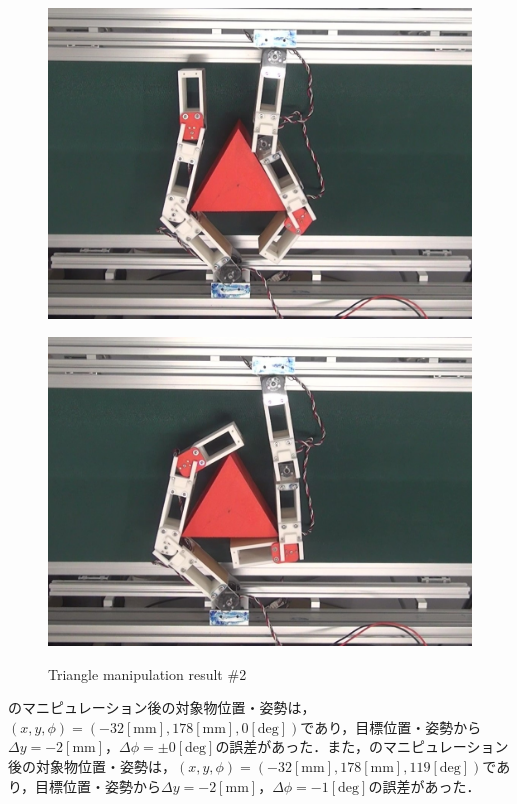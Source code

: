 \documentclass[a4paper,twoside,12pt,papersize, dvipdfmx]{iirthesis}
\begin{document}
\begin{figure}[b]
\begin{minipage}{0.249\hsize}
\includegraphics[width=0.98\hsize]{fig/4-manipulation-result/Triangle/2-3.jpg}
\subcaption{}\label{}
\end{minipage}\hfill
\begin{minipage}{0.249\hsize}
\centering
\includegraphics[width=0.98\hsize]{fig/4-manipulation-result/Triangle/2-4.jpg}
\subcaption{}\label{}
\end{minipage}
\caption{Triangle manipulation result \#2}\label{fig::result::trim2}
\end{figure}

のマニピュレーション後の対象物位置・姿勢は，$(x, y, \phi) = (-32 \mathrm{[mm]}, 178 \mathrm{[mm]}, 0 \mathrm{[deg]})$であり，目標位置・姿勢から$\Delta y = -2 \mathrm{[mm]}$，$\Delta \phi = \pm 0 \mathrm{[deg]}$の誤差があった．また，のマニピュレーション後の対象物位置・姿勢は，$(x, y, \phi) = (-32 \mathrm{[mm]}, 178 \mathrm{[mm]}, 119 \mathrm{[deg]})$であり，目標位置・姿勢から$\Delta y = -2 \mathrm{[mm]}$，$\Delta \phi = -1 \mathrm{[deg]}$の誤差があった．\par
\end{document}
